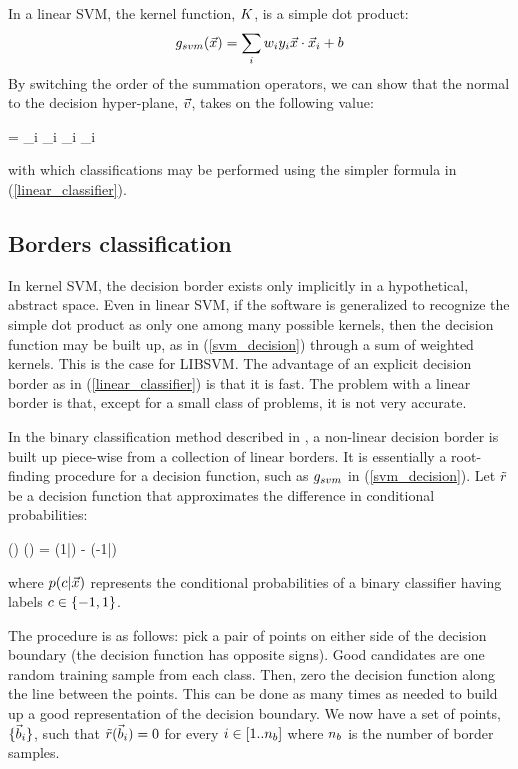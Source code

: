 In a linear SVM, the kernel function, $K$, is a simple dot product:
\begin{equation}
	g_{svm}(\vec {x}) = \sum_i w_i y_i \vec {x} \cdot \vec {x}_i + b
\end{equation}
By switching the order of the summation operators, 
we can show that the normal to the
decision hyper-plane, $\vec v$, takes on the following value:
\begin{eqnnon}
	\bordernormal = \sum_i \svmcoeff_i \classlabel_i \sample_i
\end{eqnnon}
with which classifications may be performed using the simpler formula in 
(\ref{linear_classifier}).


\subsection{Borders classification}

\label{border_method}

In kernel SVM, the decision border exists only implicitly in a hypothetical,
abstract space. Even in linear SVM, if the software is generalized to 
recognize the simple dot product as only one among many possible kernels,
then the decision function may be built up, as in (\ref{svm_decision})
through a sum of weighted kernels. This is the case for LIBSVM.
The advantage of an explicit decision border as in 
(\ref{linear_classifier}) is that it is fast. 
The problem with a linear border is that, except for a
small class of problems, it is not very accurate.

In the binary classification method described in \citet{Mills2011},
a non-linear decision border is built up piece-wise from a collection of linear borders.
It is essentially a root-finding procedure for a decision function,
such as $g_{svm}$ in (\ref{svm_decision}).
Let $\tilde r$ be a decision function
that approximates the difference in conditional probabilities:
\begin{eqnnon}
	\decisionfunction(\point) \approx \diffcondprob(\point) = 
	\condprob(1|\point) - \condprob(-1|\point)
	\label{rdef}
\end{eqnnon}
where $p(c|\vec {x})$ represents the conditional probabilities of
a binary classifier having labels $c \in \lbrace -1, 1 \rbrace$.

The procedure is as follows: pick a pair of points on either side of the decision
boundary (the decision function has opposite signs). Good candidates are one
random training sample from each class. Then, zero the decision function
along the line between the points. This can be done as many times as needed
to build up a good representation of the decision boundary.
We now have a set of points, $\lbrace \vec b_i \rbrace$, such that
$\tilde r(\vec b_i)=0$ for every $i \in [1..n_b]$ where
$n_b$ is the number of border samples.

